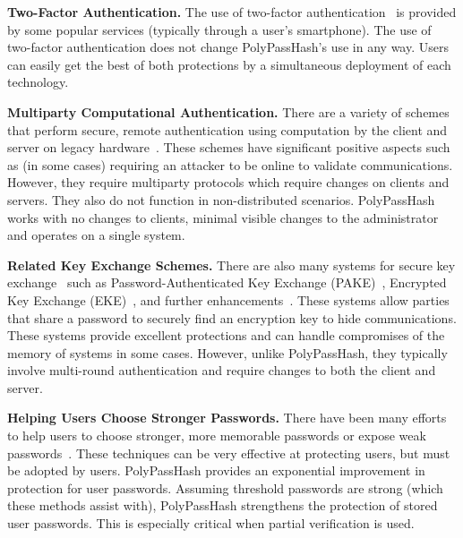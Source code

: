 {\bf Two-Factor Authentication.}
The use of two-factor authentication~\cite{di2005two} is provided by some 
popular services (typically through a user's smartphone).   The use of 
two-factor authentication does not
change PolyPassHash's use in any way.   Users can easily get the best of both
protections by a simultaneous deployment of each technology.



{\bf Multiparty Computational Authentication.}
There are a variety of schemes that perform secure, remote authentication using
computation by the client and server on legacy hardware~\cite{wu1998secure,
Lomas_SOSP_89, chien2001modified, jan1998paramita, gong1995optimal, 
camenisch2010credential, brainard2003nightingale,
katz2001efficient, katz2003forward, gong1993protecting}.  These schemes have 
significant positive aspects such as (in some cases) requiring an attacker to 
be online to validate communications.   However, they require multiparty 
protocols which require changes on clients and servers.   They also do not 
function in non-distributed scenarios.   PolyPassHash works with no 
changes to clients, minimal visible changes to the administrator and
operates on a single system.


{\bf Related Key Exchange Schemes.}
There are also many systems for secure key exchange~\cite{shoup1999formal} 
such as Pass\-word-Au\-then\-ti\-cated Key Exchange
(PAKE)~\cite{boyko2000provably, shen2010towards,sathik2010secret, 
jablon1996strong}, Encrypted Key Exchange (EKE)~\cite{steiner1995refinement,
lucks1998open, jablon1997extended}, and further 
enhancements~\cite{wang2005strengthening}.   These 
systems allow parties that
share a password to securely find an encryption key to hide communications.   
These systems provide excellent protections and can handle compromises
of the memory of systems in some cases.   However, unlike PolyPassHash, they 
typically involve multi-round authentication and require changes to both the 
client and server.


{\bf Helping Users Choose Stronger Passwords.}
There have been many efforts to help users to choose stronger,
more memorable passwords or expose weak 
passwords~\cite{topkara2007passwords,klein1990foiling,bishop1995improving,
schechter2010popularity,
komanduri2011passwords, shay2010encountering, xkcdpassword}.   These 
techniques can be very effective at protecting users,
but must be adopted by users.
PolyPassHash provides an exponential improvement in protection for user 
passwords.   Assuming threshold passwords are strong
(which these methods assist with), PolyPassHash strengthens the
protection of stored user passwords.   This is especially critical when
partial verification is used.

